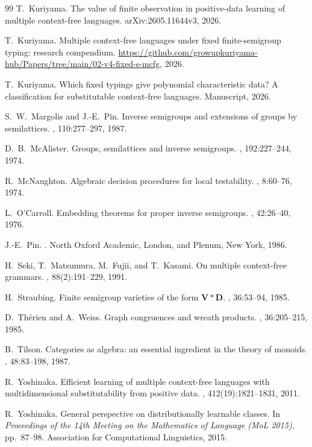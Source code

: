 \documentclass[11pt]{article}
\numberwithin{equation}{section}
\theoremstyle{plain}
\theoremstyle{definition}
\theoremstyle{remark}
\theoremstyle{plain}
\begin{document}
\begin{thebibliography}{99}
T.~Kuriyama.
\newblock The value of finite observation in positive-data learning of multiple
context-free languages.
\newblock arXiv:2605.11644v3, 2026.

T.~Kuriyama.
\newblock Multiple context-free languages under fixed finite-semigroup typing:
research compendium.
\newblock \url{https://github.com/growupkuriyama-hub/Papers/tree/main/02-v4-fixed-s-mcfg},
2026.

T.~Kuriyama.
\newblock Which fixed typings give polynomial characteristic data? A
classification for substitutable context-free languages.
\newblock Manuscript, 2026.

S.~W.~Margolis and J.-E.~Pin.
\newblock Inverse semigroups and extensions of groups by semilattices.
, 110:277--297, 1987.

D.~B.~McAlister.
\newblock Groups, semilattices and inverse semigroups.
, 192:227--244,
1974.

R.~McNaughton.
\newblock Algebraic decision procedures for local testability.
, 8:60--76, 1974.

L.~O'Carroll.
\newblock Embedding theorems for proper inverse semigroups.
, 42:26--40, 1976.

J.-E.~Pin.
.
\newblock North Oxford Academic, London, and Plenum, New York, 1986.

H.~Seki, T.~Matsumura, M.~Fujii, and T.~Kasami.
\newblock On multiple context-free grammars.
, 88(2):191--229, 1991.

H.~Straubing.
\newblock Finite semigroup varieties of the form $\mathbf V*\mathbf D$.
, 36:53--94, 1985.

D.~Th\'erien and A.~Weiss.
\newblock Graph congruences and wreath products.
, 36:205--215, 1985.

B.~Tilson.
\newblock Categories as algebra: an essential ingredient in the theory of
monoids.
, 48:83--198, 1987.

R.~Yoshinaka.
\newblock Efficient learning of multiple context-free languages with
multidimensional substitutability from positive data.
, 412(19):1821--1831, 2011.

R.~Yoshinaka.
\newblock General perspective on distributionally learnable classes.
\newblock In {\em Proceedings of the 14th Meeting on the Mathematics of Language
(MoL 2015)}, pp.~87--98. Association for Computational Linguistics, 2015.

\end{thebibliography}
\end{document}
